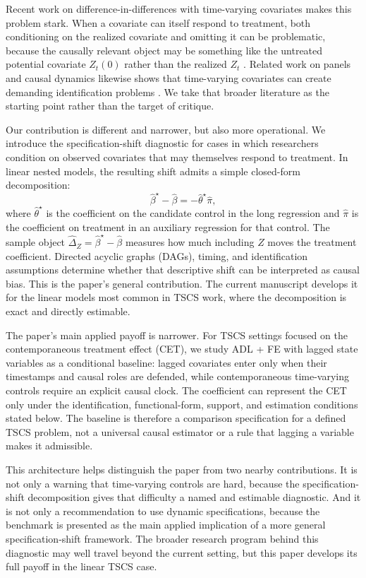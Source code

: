\documentclass[
]{article}
\begin{document}
Recent work on difference-in-differences with time-varying covariates
makes this problem stark. When a covariate can itself respond to
treatment, both conditioning on the realized covariate and omitting it
can be problematic, because the causally relevant object may be
something like the untreated potential covariate \(Z_t(0)\) rather than
the realized \(Z_t\)
\citep{caetano_callaway2024, caetano_etal2022, lin_zhang2022}. Related
work on panels and causal dynamics likewise shows that time-varying
covariates can create demanding identification problems
\citep{blackwell2018make, imai_kim2021}. We take that broader literature
as the starting point rather than the target of critique.

Our contribution is different and narrower, but also more operational.
We introduce the specification-shift diagnostic for cases in which
researchers condition on observed covariates that may themselves respond
to treatment. In linear nested models, the resulting shift admits a
simple closed-form decomposition: \[
\widehat{\beta}^{\star} - \widehat{\beta} = - \widehat{\theta}^{\star}\widehat{\pi},
\] where \(\widehat{\theta}^{\star}\) is the coefficient on the
candidate control in the long regression and \(\widehat{\pi}\) is the
coefficient on treatment in an auxiliary regression for that control.
The sample object
\(\widehat{\Delta}_Z=\widehat{\beta}^{\star}-\widehat{\beta}\) measures
how much including \(Z\) moves the treatment coefficient. Directed
acyclic graphs (DAGs), timing, and identification assumptions determine
whether that descriptive shift can be interpreted as causal bias. This
is the paper's general contribution. The current manuscript develops it
for the linear models most common in TSCS work, where the decomposition
is exact and directly estimable.

The paper's main applied payoff is narrower. For TSCS settings focused
on the contemporaneous treatment effect (CET), we study ADL + FE with
lagged state variables as a conditional baseline: lagged covariates
enter only when their timestamps and causal roles are defended, while
contemporaneous time-varying controls require an explicit causal clock.
The coefficient can represent the CET only under the identification,
functional-form, support, and estimation conditions stated below. The
baseline is therefore a comparison specification for a defined TSCS
problem, not a universal causal estimator or a rule that lagging a
variable makes it admissible.

This architecture helps distinguish the paper from two nearby
contributions. It is not only a warning that time-varying controls are
hard, because the specification-shift decomposition gives that
difficulty a named and estimable diagnostic. And it is not only a
recommendation to use dynamic specifications, because the benchmark is
presented as the main applied implication of a more general
specification-shift framework. The broader research program behind this
diagnostic may well travel beyond the current setting, but this paper
develops its full payoff in the linear TSCS case.
\end{document}
